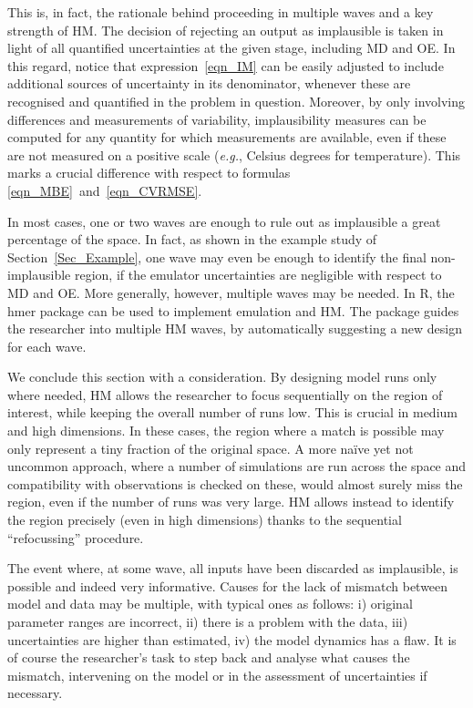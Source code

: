 \documentclass[preprint,12pt, sort&compress]{elsarticle}
\begin{document}
This is, in fact, the rationale behind proceeding in multiple waves and a key strength of HM. The decision of rejecting an output as implausible is taken in light of all quantified uncertainties at the given stage, including MD and OE. In this regard, notice that expression~\eqref{eqn_IM} can be easily adjusted to include additional sources of uncertainty in its denominator, whenever these are recognised and quantified in the problem in question. Moreover, by only involving differences and measurements of variability, implausibility measures can be computed for any quantity for which measurements are available, even if these are not measured on a positive scale (\textit{e.g.}, Celsius degrees for temperature). This marks a crucial difference with respect to formulas \eqref{eqn_MBE}~and~\eqref{eqn_CVRMSE}.

In most cases, one or two waves are enough to rule out as implausible a great percentage of the space. In fact, as shown in the example study of Section~\ref{Sec_Example}, one wave may even be enough to identify the final non-implausible region, if the emulator uncertainties are negligible with respect to MD and OE. More generally, however, multiple waves may be needed. In R, the hmer package \cite{hmer} can be used to implement emulation and HM. The package guides the researcher into multiple HM waves, by automatically suggesting a new design for each wave. %

We conclude this section with a consideration. By designing model runs only where needed, HM allows the researcher to focus sequentially on the region of interest, while keeping the overall number of runs low. This is crucial in medium and high dimensions. In these cases, the region where a match is possible may only represent a tiny fraction of the original space. A more na\"ive yet not uncommon approach, where a number of simulations are run across the space and compatibility with observations is checked on these, would almost surely miss the region, even if the number of runs was very large. HM allows instead to identify the region precisely (even in high dimensions) thanks to the sequential “refocussing” procedure. 

The event where, at some wave, all inputs have been discarded as implausible, is possible and indeed very informative. Causes for the lack of mismatch between model and data may be multiple, with typical ones as follows: i) original parameter ranges are incorrect, ii) there is a problem with the data, iii) uncertainties are higher than estimated, iv) the model dynamics has a flaw. It is of course the researcher’s task to step back and analyse what causes the mismatch, intervening on the model or in the assessment of uncertainties if necessary.
\end{document}
